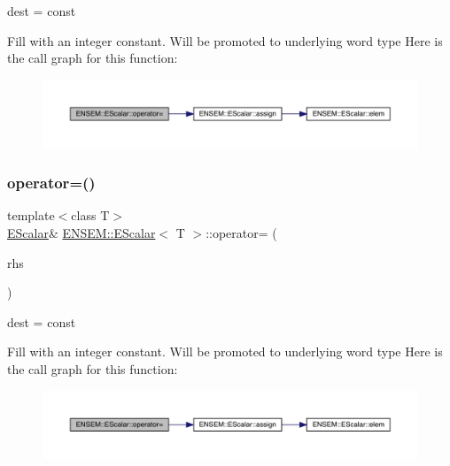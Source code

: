 dest = const 

Fill with an integer constant. Will be promoted to underlying word type Here is the call graph for this function\+:
\nopagebreak
\begin{figure}[H]
\begin{center}
\leavevmode
\includegraphics[width=350pt]{d0/d82/classENSEM_1_1EScalar_a01ae8ddc1b0d0e4ecd65f5de624faee5_cgraph}
\end{center}
\end{figure}
\mbox{\label{classENSEM_1_1EScalar_a01ae8ddc1b0d0e4ecd65f5de624faee5}} 
\subsubsection{\texorpdfstring{operator=()}{operator=()}\hspace{0.1cm}{\footnotesize\ttfamily [2/8]}}
{\footnotesize\ttfamily template$<$class T$>$ \\
\mbox{\hyperlink{classENSEM_1_1EScalar}{E\+Scalar}}\& \mbox{\hyperlink{classENSEM_1_1EScalar}{E\+N\+S\+E\+M\+::\+E\+Scalar}}$<$ T $>$\+::operator= (\begin{DoxyParamCaption}\item[{const typename \mbox{\hyperlink{structENSEM_1_1WordType}{Word\+Type}}$<$ T $>$\+::Type\+\_\+t \&}]{rhs }\end{DoxyParamCaption})\hspace{0.3cm}{\ttfamily [inline]}}



dest = const 

Fill with an integer constant. Will be promoted to underlying word type Here is the call graph for this function\+:
\nopagebreak
\begin{figure}[H]
\begin{center}
\leavevmode
\includegraphics[width=350pt]{d0/d82/classENSEM_1_1EScalar_a01ae8ddc1b0d0e4ecd65f5de624faee5_cgraph}
\end{center}
\end{figure}
\mbox{\label{classENSEM_1_1EScalar_a9619fd24baf50fd03986c3056a484cb9}} 

